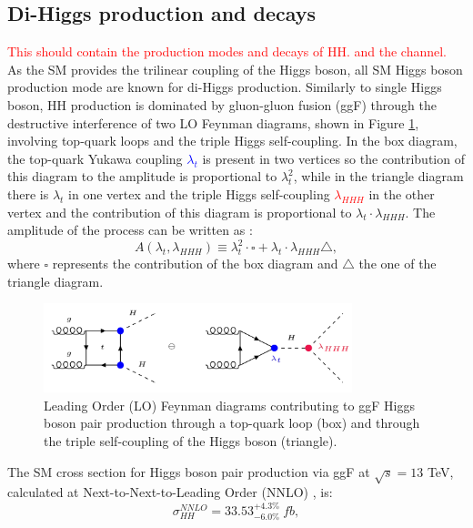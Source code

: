 \subsection{Di-Higgs production and decays} 
\label{chap1:HH:HPD}
\textcolor{red}{This should contain the production modes and decays of HH. and the \HHyybb channel.
\\
}
As the SM provides the trilinear coupling of the Higgs boson, all SM Higgs boson production mode are known for di-Higgs production. Similarly to single Higgs boson, HH production is dominated by gluon-gluon fusion (ggF) through the destructive interference of two LO Feynman diagrams, shown in Figure \ref{fig:chap1:HH:HPD:FY}, involving top-quark loops and the triple Higgs self-coupling. In the box diagram, the top-quark Yukawa coupling \textcolor{blue}{$\lambda_t$} is present in two vertices so the contribution of this diagram to the amplitude is proportional to $\lambda_t^2$, while in the triangle diagram there is $\lambda_t$ in one vertex and the triple Higgs self-coupling \textcolor{red}{$\lambda_{HHH}$} in the other vertex and the contribution of this diagram is proportional to $\lambda_t\cdot\lambda_{HHH}$. The amplitude of the process can be written as :
\begin{equation}
    A(\lambda_t, \lambda_{HHH}) \equiv \lambda_t^2\cdot\square + \lambda_t\cdot\lambda_{HHH}\bigtriangleup,
\end{equation}
where $\square$ represents the contribution of the box diagram and $\bigtriangleup$ the one of the triangle diagram. 
\begin{figure}[H]
    \centering
    \includegraphics[width=0.8\textwidth]{Ch1/Img/HH_feyn.png}
    \caption{Leading Order (LO) Feynman diagrams contributing to ggF Higgs boson pair production through a top-quark loop (box) and through the triple self-coupling of the Higgs boson (triangle).}
    \label{fig:chap1:HH:HPD:FY}
\end{figure}
The SM cross section for Higgs boson pair production via ggF at $\sqrt{s}=13$ TeV, calculated at Next-to-Next-to-Leading Order (NNLO) \cite{HHXSec1, HHXSec2}, is:
\begin{equation}
    \sigma_{HH}^{NNLO} = 33.53_{-6.0\%}^{+4.3\%} \ fb,
    \label{eq:chap1:HH:XSEC:NNL0}
\end{equation}
